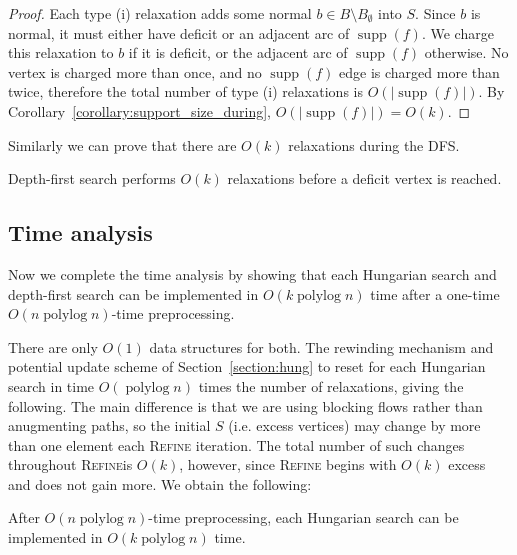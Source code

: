 \documentclass[a4paper,UKenglish]{socg-lipics-v2018}
\def\polylog{\mathop{\mathrm{polylog}}}
\def\supp{\operatorname{supp}}
\theoremstyle{plain}
\numberwithin{figure}{section}
\begin{document}
\begin{toappendix}
\begin{proof}
Each type (i) relaxation adds some normal $b \in B \setminus B_\emptyset$
into $S$.
Since $b$ is normal, it must either have deficit or an adjacent arc of
$\supp(f)$.
We charge this relaxation to $b$ if it is deficit, or the adjacent arc of
$\supp(f)$ otherwise.
No vertex is charged more than once, and no $\supp(f)$ edge is charged more
than twice, therefore the total number of type (i) relaxations is
$O(|\supp(f)|)$.
By Corollary~\ref{corollary:support_size_during}, $O(|\supp(f)|) = O(k)$.
\end{proof}

Similarly we can prove that there are $O(k)$ relaxations during the DFS.

\begin{corollary}
\label{corollary:goldberg_dfs_length}
Depth-first search performs $O(k)$ relaxations before a deficit vertex is reached.
\end{corollary}



\subsection{Time analysis}
\label{SSA:time-ananlsis}

Now we complete the time analysis by showing that each Hungarian search and
depth-first search can be implemented in $O(k \polylog n)$ time after a
one-time $O(n \polylog n)$-time preprocessing.

There are only $O(1)$ data structures for both.
The rewinding mechanism and potential update scheme of
Section~\ref{section:hung} to reset for each Hungarian search in
time $O(\polylog n)$ times the number of relaxations, giving the following.
The main difference is that we are using blocking flows rather than anugmenting
paths, so the initial $S$ (i.e. excess vertices) may change by more than
one element each \textsc{Refine} iteration.
The total number of such changes throughout \textsc{Refine}is $O(k)$, however,
since \textsc{Refine} begins with $O(k)$ excess and does not gain more.
We obtain the following:

\begin{lemmarep}
\label{lemma:goldberg_hs_time}
After $O(n \polylog n)$-time preprocessing,
each Hungarian search can be implemented in $O(k \polylog n)$ time.
\end{lemmarep}


\end{toappendix}
\end{document}

